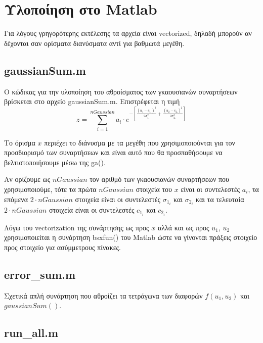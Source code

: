 \chapter{Υλοποίηση στο Matlab} \label{ch:matlab}

Για λόγους γρηγορότερης εκτέλεσης τα αρχεία είναι vectorized,
δηλαδή μπορούν αν δέχονται σαν ορίσματα διανύσματα αντί για βαθμωτά μεγέθη.

\section{gaussianSum.m}



Ο κώδικας για την υλοποίηση του αθροίσματος των γκαουσιανών συναρτήσεων βρίσκεται στο αρχείο gaussianSum.m. Επιστρέφεται η τιμή 
\begin{equation}
	z = \sum_{i = 1}^{nGaussian} a_i \cdot e^{-[\frac{(u_1 - c_{1_i})^2}{2\sigma_{1_i}^2} + \frac{(u_2 - c_{2_i})^2}{2\sigma_{2_i}^2}]}
\end{equation}

Το όρισμα $x$ περιέχει το διάνυσμα με τα μεγέθη που χρησιμοποιούνται για τον προσδιορισμό των συναρτήσεων 
και είναι αυτό που θα προσπαθήσουμε να βελτιστοποιήσουμε μέσω της ga().

Αν ορίζουμε ως $nGaussian$ τον αριθμό των γκαουσιανών συναρτήσεων που χρησιμοποιούμε, 
τότε τα πρώτα $nGaussian$ στοιχεία του $x$ είναι οι συντελεστές $a_i$, 
τα επόμενα $2 \cdot nGaussian$ στοιχεία είναι οι συντελεστές $\sigma_{1_i}$ και $\sigma_{2_i}$ 
και τα τελευταία $2 \cdot nGaussian$ στοιχεία είναι οι συντελεστές $c_{1_i}$ και $c_{2_i}$.

Λόγω του vectorization της συνάρτησης ως προς $x$ αλλά και ως προς $u_1$, $u_2$ χρησιμοποιείται η συνάρτηση bsxfun() του Matlab ώστε να γίνονται πράξεις στοιχείο προς στοιχείο για ασύμμετρους πίνακες.

\section{error\_sum.m}



Σχετικά απλή συνάρτηση που αθροίζει τα τετράγωνα των διαφορών $f(u_1, u_2)$ και $gaussianSum()$.

\section{run\_all.m}

